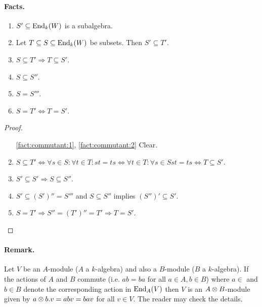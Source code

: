 \documentclass[12pt,a4paper]{scrartcl}
\theoremstyle{cplain}
\theoremstyle{cplain}
\theoremstyle{cplain}
\theoremstyle{definition}
\begin{document}
\begin{otherlanguage}{english}
\paragraph{Facts.}
\begin{enumerate}
  \item \label{fact:commutant:1} $S' \subseteq \operatorname{End}_k(W)$ is a subalgebra.
  \item \label{fact:commutant:2} Let $T\subseteq S \subseteq \operatorname{End}_k(W)$ be subsets. Then $S' \subseteq T'$.
  \item \label{fact:commutant:3} $S\subseteq T' \Rightarrow T \subseteq S'$.
  \item \label{fact:commutant:4} $S \subseteq S''$.
  \item \label{fact:commutant:5} $S = S'''$.
  \item \label{fact:commutant:6} $S = T' \Leftrightarrow T = S'$.
\end{enumerate}
\begin{proof}
  \leavevmode
  \begin{enumerate}[label=\ref{fact:commutant:\arabic*}]
    \item[\ref{fact:commutant:1}, \ref{fact:commutant:2}] Clear.
    \setcounter{enumi}{2}
    \item $S \subseteq T' \Leftrightarrow \forall s\in S:\forall t\in T: st = ts \Leftrightarrow \forall t \in T:\forall s\in S st = ts \Leftrightarrow T \subseteq S'$.
    \item $S' \subseteq S'\Rightarrow S \subseteq S''$.
    \item $S' \subseteq (S')'' = S'''$ and $S \subseteq S''$ implies $(S'')' \subseteq S'$.
    \item $S = T' \Rightarrow S'' = (T')'' = T' \Rightarrow T = S'$.
    \qedhere
  \end{enumerate}
\end{proof}

\paragraph{Remark.}
Let $V$ be an $A$-module ($A$ a $k$-algebra) and also a $B$-module ($B$ a $k$-algebra). If the actions of $A$ and $B$ commute (i.e. $ab = ba $ for all $a\in A,b\in B$) where $a\in $ and $b\in B$ denote the corresponding action in $\operatorname{End}_A(V)$ then $V$ is an $A \otimes B$-module given by $a\otimes b .v = abv = bav$ for all $v\in V$. The reader may check the details.


\end{otherlanguage}
\end{document}
